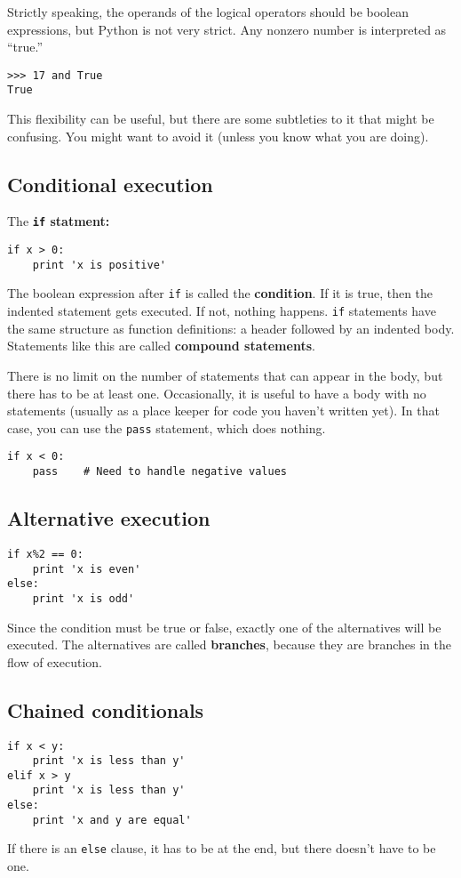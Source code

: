 \documentclass{article}
\begin{document}
Strictly speaking, the operands of the logical operators should be
boolean expressions, but Python is not very strict. Any nonzero number
is interpreted as ``true.''
\begin{lstlisting}
>>> 17 and True
True
\end{lstlisting}
This flexibility can be useful, but there are some subtleties to it
that might be confusing. You might want to avoid it (unless you know
what you are doing).

\subsection{Conditional execution}
The \textbf{\texttt{if} statment:}
\begin{lstlisting}
if x > 0:
    print 'x is positive'
\end{lstlisting}
The boolean expression after \verb|if| is called the \textbf{condition}.
If it is true, then the indented statement gets executed. If not, nothing
happens.
\verb|if| statements have the same structure as function definitions: a
header followed by an indented body. Statements like this are called
\textbf{compound statements}.

There is no limit on the number of statements that can appear in the
body, but there has to be at least one. Occasionally, it is useful to
have a body with no statements (usually as a place keeper for code you
haven't written yet). In that case, you can use the \verb|pass| statement,
which does nothing.
\begin{lstlisting}
if x < 0:
    pass    # Need to handle negative values
\end{lstlisting}

\subsection{Alternative execution}
\begin{lstlisting}
if x%2 == 0:
    print 'x is even'
else:
    print 'x is odd'
\end{lstlisting}
Since the condition must be true or false, exactly one of the alternatives will
be executed. The alternatives are called \textbf{branches}, because they are branches in
the flow of execution.

\subsection{Chained conditionals}
\begin{lstlisting}
if x < y:
    print 'x is less than y'
elif x > y
    print 'x is less than y'
else:
    print 'x and y are equal'
\end{lstlisting}
If there is an \verb|else| clause, it has to be at the end,
but there doesn't have to be one.
\end{document}
